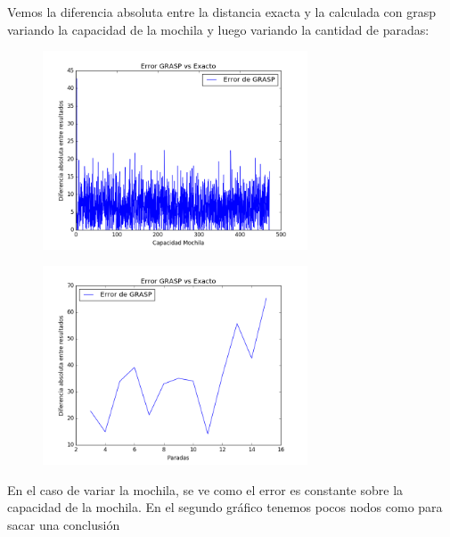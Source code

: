 \begin{itemize}
Vemos la diferencia absoluta entre la distancia exacta y la calculada con grasp variando la capacidad de la mochila y luego variando la cantidad de paradas:
\begin{figure}[H]
	\begin{center}
		\includegraphics[width=0.7\textwidth]{img/ejercicio4/CalidadMochilas.png}
		\caption{}
		\label{fig: ej4_gimnasios}
	\end{center}
\end{figure}

\begin{figure}[H]
	\begin{center}
		\includegraphics[width=0.7\textwidth]{img/ejercicio4/CalidadPokes.png}
		\caption{}
		\label{fig: ej4_mochila}
	\end{center}
\end{figure}

En el caso de variar la mochila, se ve como el error es constante sobre la capacidad de la mochila.\newline
En el segundo gráfico tenemos pocos nodos como para sacar una conclusión
\end{itemize}

